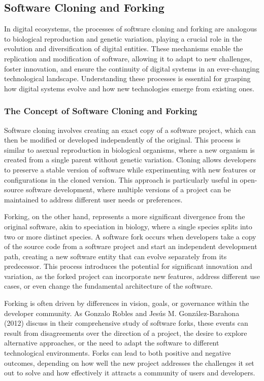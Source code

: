 \documentclass[12pt,twoside]{article}
\begin{document}
\subsection{Software Cloning and Forking}

In digital ecosystems, the processes of software cloning and forking are analogous to biological reproduction and genetic variation, playing a crucial role in the evolution and diversification of digital entities. These mechanisms enable the replication and modification of software, allowing it to adapt to new challenges, foster innovation, and ensure the continuity of digital systems in an ever-changing technological landscape. Understanding these processes is essential for grasping how digital systems evolve and how new technologies emerge from existing ones.

\subsubsection{The Concept of Software Cloning and Forking}

Software cloning involves creating an exact copy of a software project, which can then be modified or developed independently of the original. This process is similar to asexual reproduction in biological organisms, where a new organism is created from a single parent without genetic variation. Cloning allows developers to preserve a stable version of software while experimenting with new features or configurations in the cloned version. This approach is particularly useful in open-source software development, where multiple versions of a project can be maintained to address different user needs or preferences.

Forking, on the other hand, represents a more significant divergence from the original software, akin to speciation in biology, where a single species splits into two or more distinct species. A software fork occurs when developers take a copy of the source code from a software project and start an independent development path, creating a new software entity that can evolve separately from its predecessor. This process introduces the potential for significant innovation and variation, as the forked project can incorporate new features, address different use cases, or even change the fundamental architecture of the software.

Forking is often driven by differences in vision, goals, or governance within the developer community. As Gonzalo Robles and Jesús M. González-Barahona (2012) discuss in their comprehensive study of software forks, these events can result from disagreements over the direction of a project, the desire to explore alternative approaches, or the need to adapt the software to different technological environments. Forks can lead to both positive and negative outcomes, depending on how well the new project addresses the challenges it set out to solve and how effectively it attracts a community of users and developers.
\end{document}
